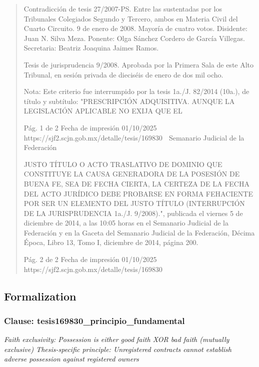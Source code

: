 \documentclass[11pt,a4paper]{article}
\begin{document}
\begin{quote}
Contradicción de tesis 27/2007-PS. Entre las sustentadas por los Tribunales Colegiados Segundo y
Tercero, ambos en Materia Civil del Cuarto Circuito. 9 de enero de 2008. Mayoría de cuatro votos.
Disidente: Juan N. Silva Meza. Ponente: Olga Sánchez Cordero de García Villegas. Secretaria:
Beatriz Joaquina Jaimes Ramos.

Tesis de jurisprudencia 9/2008. Aprobada por la Primera Sala de este Alto Tribunal, en sesión
privada de dieciséis de enero de dos mil ocho.

Nota: Este criterio fue interrumpido por la tesis 1a./J. 82/2014 (10a.), de título y subtítulo:
"PRESCRIPCIÓN ADQUISITIVA. AUNQUE LA LEGISLACIÓN APLICABLE NO EXIJA QUE EL

                                             Pág. 1 de 2             Fecha de impresión 01/10/2025
  https://sjf2.scjn.gob.mx/detalle/tesis/169830
                                                  Semanario Judicial de la Federación

JUSTO TÍTULO O ACTO TRASLATIVO DE DOMINIO QUE CONSTITUYE LA CAUSA
GENERADORA DE LA POSESIÓN DE BUENA FE, SEA DE FECHA CIERTA, LA CERTEZA DE LA
FECHA DEL ACTO JURÍDICO DEBE PROBARSE EN FORMA FEHACIENTE POR SER UN
ELEMENTO DEL JUSTO TÍTULO (INTERRUPCIÓN DE LA JURISPRUDENCIA 1a./J. 9/2008).",
publicada el viernes 5 de diciembre de 2014, a las 10:05 horas en el Semanario Judicial de la
Federación y en la Gaceta del Semanario Judicial de la Federación, Décima Época, Libro 13, Tomo
I, diciembre de 2014, página 200.




                                             Pág. 2 de 2        Fecha de impresión 01/10/2025
  https://sjf2.scjn.gob.mx/detalle/tesis/169830

\end{quote}

\subsection{Formalization}

\subsubsection{Clause: tesis169830\_principio\_fundamental}

\textit{Faith exclusivity: Possession is either good faith XOR bad faith (mutually exclusive) Thesis-specific principle: Unregistered contracts cannot establish adverse possession against registered owners}
\end{document}
